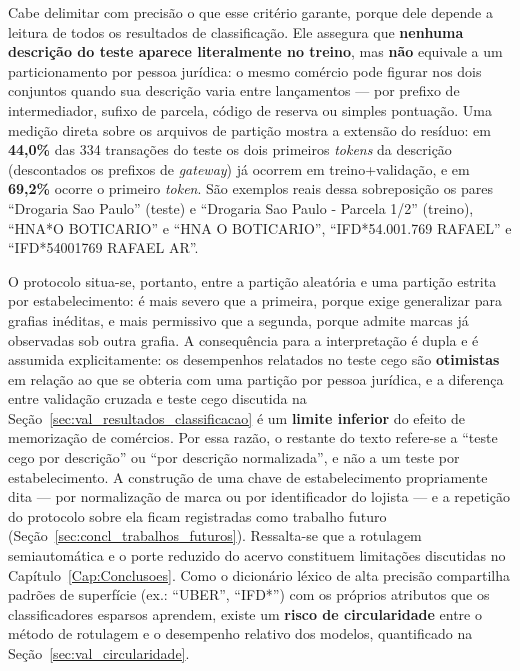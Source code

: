 Cabe delimitar com precisão o que esse critério garante, porque dele depende a leitura de todos os resultados de classificação. Ele assegura que \textbf{nenhuma descrição do teste aparece literalmente no treino}, mas \textbf{não} equivale a um particionamento por pessoa jurídica: o mesmo comércio pode figurar nos dois conjuntos quando sua descrição varia entre lançamentos --- por prefixo de intermediador, sufixo de parcela, código de reserva ou simples pontuação. Uma medição direta sobre os arquivos de partição mostra a extensão do resíduo: em \textbf{44,0\%} das 334 transações do teste os dois primeiros \textit{tokens} da descrição (descontados os prefixos de \textit{gateway}) já ocorrem em treino+validação, e em \textbf{69,2\%} ocorre o primeiro \textit{token}. São exemplos reais dessa sobreposição os pares ``Drogaria Sao Paulo'' (teste) e ``Drogaria Sao Paulo - Parcela 1/2'' (treino), ``HNA*O BOTICARIO'' e ``HNA O BOTICARIO'', ``IFD*54.001.769 RAFAEL'' e ``IFD*54001769 RAFAEL AR''.

O protocolo situa-se, portanto, entre a partição aleatória e uma partição estrita por estabelecimento: é mais severo que a primeira, porque exige generalizar para grafias inéditas, e mais permissivo que a segunda, porque admite marcas já observadas sob outra grafia. A consequência para a interpretação é dupla e é assumida explicitamente: os desempenhos relatados no teste cego são \textbf{otimistas} em relação ao que se obteria com uma partição por pessoa jurídica, e a diferença entre validação cruzada e teste cego discutida na Seção~\ref{sec:val_resultados_classificacao} é um \textbf{limite inferior} do efeito de memorização de comércios. Por essa razão, o restante do texto refere-se a ``teste cego por descrição'' ou ``por descrição normalizada'', e não a um teste por estabelecimento. A construção de uma chave de estabelecimento propriamente dita --- por normalização de marca ou por identificador do lojista --- e a repetição do protocolo sobre ela ficam registradas como trabalho futuro (Seção~\ref{sec:concl_trabalhos_futuros}). Ressalta-se que a rotulagem semiautomática e o porte reduzido do acervo constituem limitações discutidas no Capítulo~\ref{Cap:Conclusoes}. Como o dicionário léxico de alta precisão compartilha padrões de superfície (ex.: ``UBER'', ``IFD*'') com os próprios atributos que os classificadores esparsos aprendem, existe um \textbf{risco de circularidade} entre o método de rotulagem e o desempenho relativo dos modelos, quantificado na Seção~\ref{sec:val_circularidade}.

